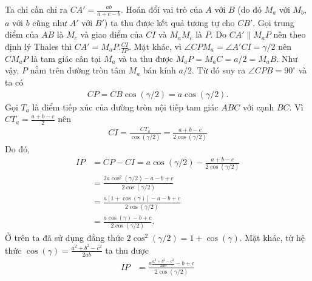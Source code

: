 \begin{multicols}{2}
\begin{figure}[H]
{}
			\vspace*{-10pt}
		\end{figure}
		Ta chỉ cần chỉ ra $CA' = \frac{ab}{a+c-b}$. Hoán đổi vai trò của $A$ với $B$ (do đó $M_a$ với $M_b$, $a$ với $b$ cũng như $A'$ với $B'$) ta thu được kết quả tương tự cho $CB'$. 
		\vskip 0.1cm
		Gọi trung điểm của $AB$ là $M_c$ và giao điểm của $CI$ và $M_aM_c$ là $P$. Do $CA' \parallel M_aP$ nên theo định lý Thales thì $CA' = M_aP. \frac{CI}{IP}$. Mặt khác, vì $\angle CPM_a = \angle A'CI = \gamma/2$ nên $CM_aP$ là tam giác cân tại $M_a$ và ta thu được $M_aP = M_aC = a/2 = M_aB$. Như vậy, $P$ nằm trên đường tròn tâm $M_a$ bán kính $a/2$. Từ đó suy ra $\angle CPB = 90^{\circ}$ và ta có 
		\begin{align*}
			CP = CB \cos (\gamma /2) = a \cos(\gamma/2).
		\end{align*}
		Gọi $T_a$ là điểm tiếp xúc của đường tròn nội tiếp tam giác $ABC$ với cạnh $BC$. Vì $CT_a = \frac{a+b-c}{2}$ nên 
		\begin{align*}
			CI = \frac{CT_a}{\cos(\gamma/2)} = \frac{a+b-c}{2 \cos(\gamma/2)}
		\end{align*} 
		Do đó,
		\begin{align*}
			IP &= CP -CI  = a \cos(\gamma/2) - \frac{a+b-c}{2 \cos(\gamma/2)} \\
			& = \frac{2a \cos^2(\gamma/2) - a-b+c}{2 \cos (\gamma/2)} \\
			& = \frac{a[1+\cos (\gamma)] - a -b +c}{2 \cos (\gamma/2)} \\
			& = \frac{a\cos(\gamma) - b +c}{2 \cos (\gamma/2)}.
		\end{align*}
		Ở trên ta đã sử dụng đẳng thức $2 \cos^2(\gamma/2) = 1 + \cos (\gamma)$. Mặt khác, từ hệ thức $\cos(\gamma) = \frac{a^2 + b^2 - c^2}{2ab}$ ta thu được
		\begin{align*}
			IP & = \frac{a \frac{a^2 + b^2 - c^2}{2ab} -b+c}{2 \cos (\gamma/2)} \\

\end{align*}
\end{multicols}

